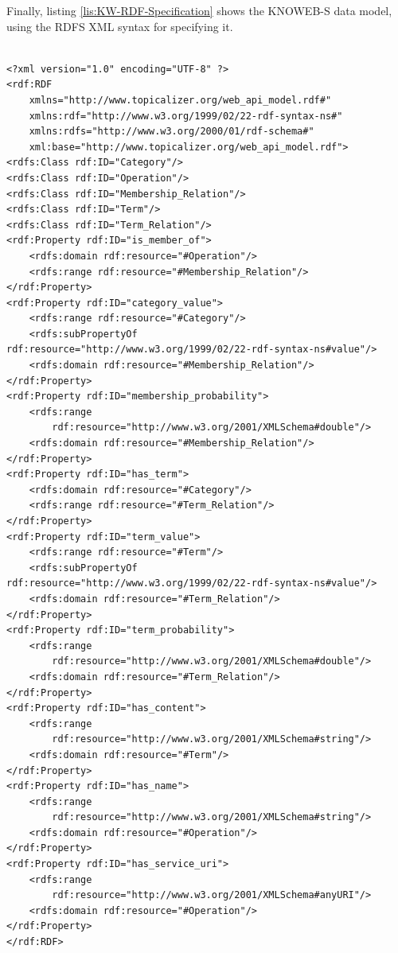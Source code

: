 Finally, listing \ref{lis:KW-RDF-Specification} shows the KNOWEB-S data model, using the RDFS XML syntax for specifying it. 

\begin{scriptsize}
\begin{lstlisting}[caption={RDF Specification of KNOWEB-S},label={lis:KW-RDF-Specification}]

<?xml version="1.0" encoding="UTF-8" ?> 
<rdf:RDF
	xmlns="http://www.topicalizer.org/web_api_model.rdf#"
	xmlns:rdf="http://www.w3.org/1999/02/22-rdf-syntax-ns#"
	xmlns:rdfs="http://www.w3.org/2000/01/rdf-schema#"
	xml:base="http://www.topicalizer.org/web_api_model.rdf">   
<rdfs:Class rdf:ID="Category"/>
<rdfs:Class rdf:ID="Operation"/>
<rdfs:Class rdf:ID="Membership_Relation"/>
<rdfs:Class rdf:ID="Term"/>
<rdfs:Class rdf:ID="Term_Relation"/>
<rdf:Property rdf:ID="is_member_of">
	<rdfs:domain rdf:resource="#Operation"/>
	<rdfs:range rdf:resource="#Membership_Relation"/>
</rdf:Property>
<rdf:Property rdf:ID="category_value">
	<rdfs:range rdf:resource="#Category"/>
	<rdfs:subPropertyOf 
rdf:resource="http://www.w3.org/1999/02/22-rdf-syntax-ns#value"/>
	<rdfs:domain rdf:resource="#Membership_Relation"/>
</rdf:Property>
<rdf:Property rdf:ID="membership_probability">
	<rdfs:range 
	    rdf:resource="http://www.w3.org/2001/XMLSchema#double"/>
	<rdfs:domain rdf:resource="#Membership_Relation"/>
</rdf:Property>
<rdf:Property rdf:ID="has_term">
	<rdfs:domain rdf:resource="#Category"/>
	<rdfs:range rdf:resource="#Term_Relation"/>
</rdf:Property>
<rdf:Property rdf:ID="term_value">
	<rdfs:range rdf:resource="#Term"/>
	<rdfs:subPropertyOf 
rdf:resource="http://www.w3.org/1999/02/22-rdf-syntax-ns#value"/>
	<rdfs:domain rdf:resource="#Term_Relation"/>
</rdf:Property>
<rdf:Property rdf:ID="term_probability">
	<rdfs:range 
	    rdf:resource="http://www.w3.org/2001/XMLSchema#double"/>
	<rdfs:domain rdf:resource="#Term_Relation"/>
</rdf:Property>
<rdf:Property rdf:ID="has_content">
	<rdfs:range 
	    rdf:resource="http://www.w3.org/2001/XMLSchema#string"/>
	<rdfs:domain rdf:resource="#Term"/>
</rdf:Property>
<rdf:Property rdf:ID="has_name">
	<rdfs:range 
	    rdf:resource="http://www.w3.org/2001/XMLSchema#string"/>
	<rdfs:domain rdf:resource="#Operation"/>
</rdf:Property>
<rdf:Property rdf:ID="has_service_uri">
	<rdfs:range 
	    rdf:resource="http://www.w3.org/2001/XMLSchema#anyURI"/>
	<rdfs:domain rdf:resource="#Operation"/>
</rdf:Property>
</rdf:RDF> 
\end{lstlisting}
\end{scriptsize}